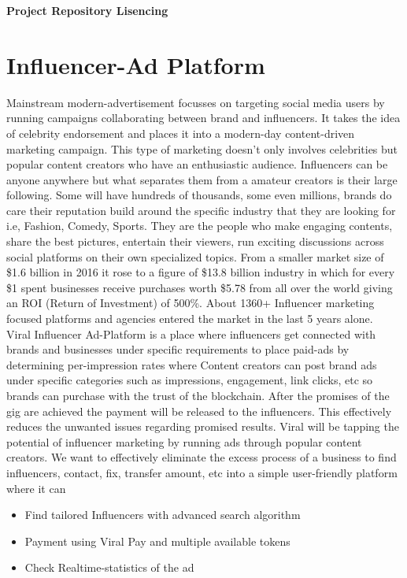 \documentclass[conference]{IEEEtran}
\begin{document}
\textbf{Project Repository Lisencing}\\

\section{\textbf{Influencer-Ad Platform}}

Mainstream modern-advertisement focusses on targeting social media users by running campaigns collaborating between brand and influencers. It takes the idea of celebrity endorsement and places it into a modern-day content-driven marketing campaign. This type of marketing doesn't only involves celebrities but popular content creators who have an enthusiastic audience. Influencers can be anyone anywhere but what separates them from a amateur creators is their large following. Some will have hundreds of thousands, some even millions, brands do care their reputation build around the specific industry that they are looking for i.e, Fashion, Comedy, Sports. They are the people who make engaging contents, share the best pictures, entertain their viewers, run exciting discussions across social platforms on their own specialized topics. From a smaller market size of \$1.6 billion in 2016 it rose to a figure of \$13.8 billion industry in which for every \$1 spent businesses receive purchases worth \$5.78 from all over the world giving an ROI (Return of Investment) of 500\%. About 1360+ Influencer marketing focused platforms and agencies entered the market in the last 5 years alone.\\

Viral Influencer Ad-Platform is a place where influencers get connected with brands and businesses under specific requirements to place paid-ads by determining per-impression rates where Content creators can post brand ads under specific categories such as impressions, engagement, link clicks, etc so brands can purchase with the trust of the blockchain. After the promises of the gig are achieved the payment will be released to the influencers. This effectively reduces the unwanted issues regarding promised results. Viral will be tapping the potential of influencer marketing by running ads through popular content creators. We want to effectively eliminate the excess process of a business to find influencers, contact, fix, transfer amount, etc into a simple user-friendly platform where it can
\begin{itemize}[wide, labelwidth=!, labelindent=0pt]
\item Find tailored Influencers with advanced search algorithm
\item Payment using Viral Pay and multiple available tokens
\item Check Realtime-statistics of the ad
\end{itemize}
\end{document}
